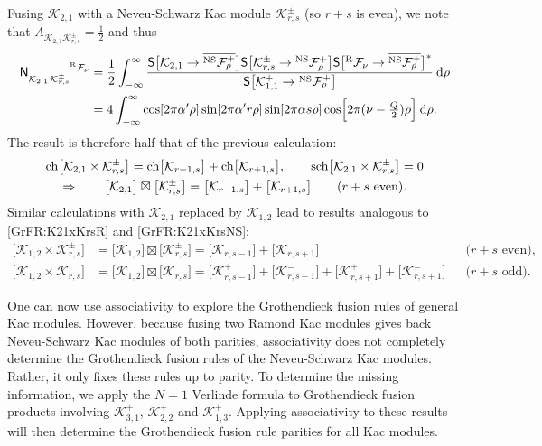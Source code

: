 \documentclass[a4paper,reqno,12pt]{report}
\theoremstyle{definition}
\numberwithin{equation}{section}
\let\originalleft\left     %
\let\originalright\right
\renewcommand{\left}{\mathopen{}\mathclose\bgroup\originalleft}
\renewcommand{\right}{\aftergroup\egroup\originalright}
\newcommand{\sqbrac}[1]{\left[ #1 \right]}
\newcommand{\dd}{\mathrm{d}}   %
\newcommand{\ra}{\rightarrow}
\newcommand{\Ra}{\Rightarrow}
\newcommand{\Kac}[1]{\mathcal{K}_{#1}}       %
\newcommand{\Fock}[1]{\mathcal{F}_{#1}}      %
\newcommand{\chmap}{\mathrm{ch}}
\newcommand{\schmap}{\mathrm{sch}}
\newcommand{\Gr}[1]{\bigl[ #1 \bigr]}            %
\newcommand{\ch}[1]{\chmap \Gr{#1}}              %
\newcommand{\sch}[1]{\schmap \Gr{#1}}              %
\newcommand{\modS}{\mathsf{S}} %
\newcommand{\Smat}[2]{\modS \bigl[ #1 \ra #2 \bigr]}  %
\newcommand{\fuse}{\mathbin{\times}}                                            %
\newcommand{\Grfuse}{\mathbin{\boxtimes}}                                       %
\newcommand{\fuscoeff}[3]{\mathsf{N}_{#1 \, #2}^{\hphantom{#1 \, #2} #3}}       %
\newcommand{\ns}{Neveu-Schwarz}
\theoremstyle{plain}
\newcommand{\NSFock}[1]{{}^{\text{NS}}\Fock{#1}}   %
\newcommand{\RFock}[1]{{}^{\text{R}}\Fock{#1}}     %
\begin{document}
Fusing $\Kac{2,1}$ with a \ns{} Kac module $\Kac{r,s}^{\pm}$ (so $r+s$ is even), we note that $A_{\Kac{2,1} \Kac{r,s}^{\pm}} = \frac{1}{2}$ and thus
\begin{align}
\fuscoeff{\Kac{2,1}}{\Kac{r,s}^{\pm}}{\RFock{\nu}} &= \frac{1}{2} \int_{-\infty}^{\infty} \frac{\Smat{\Kac{2,1}}{\overline{\NSFock{\rho}^+}} \Smat{\Kac{r,s}^{\pm}}{\NSFock{\rho}^+} \Smat{\RFock{\nu}}{\overline{\NSFock{\rho}^+}}^*}{\Smat{\Kac{1,1}^+}{\NSFock{\rho}^+}} \: \dd \rho \notag \\
&= 4 \int_{-\infty}^{\infty} \cos \sqbrac{2 \pi \alpha' \rho} \sin \sqbrac{2 \pi \alpha' r \rho} \sin \sqbrac{2 \pi \alpha s \rho} \cos \sqbrac{2 \pi (\nu - \tfrac{Q}{2}) \rho} \: \dd \rho.
\end{align}
The result is therefore half that of the previous calculation:
\begin{gather} \label{GrFR:K21xKrsNS}
\ch{\Kac{2,1} \fuse \Kac{r,s}^{\pm}} = \ch{\Kac{r-1,s}} + \ch{\Kac{r+1,s}}, \qquad \sch{\Kac{2,1} \fuse \Kac{r,s}^{\pm}} = 0 \notag \\
\Ra \qquad \Gr{\Kac{2,1}} \Grfuse \Gr{\Kac{r,s}^{\pm}} = \Gr{\Kac{r-1,s}} + \Gr{\Kac{r+1,s}} \qquad \text{(\(r+s\) even).}
\end{gather}
Similar calculations with $\Kac{2,1}$ replaced by $\Kac{1,2}$ lead to results analogous to \eqref{GrFR:K21xKrsR} and \eqref{GrFR:K21xKrsNS}:
\begin{equation}
\begin{aligned}
\Gr{\Kac{1,2} \fuse \Kac{r,s}^{\pm}} &= \Gr{\Kac{1,2}} \Grfuse \Gr{\Kac{r,s}^{\pm}} = \Gr{\Kac{r,s-1}} + \Gr{\Kac{r,s+1}} & &\text{(\(r+s\) even),} \\
\Gr{\Kac{1,2} \fuse \Kac{r,s}} &= \Gr{\Kac{1,2}} \Grfuse \Gr{\Kac{r,s}} = \Gr{\Kac{r,s-1}^+} + \Gr{\Kac{r,s-1}^-} + \Gr{\Kac{r,s+1}^+} + \Gr{\Kac{r,s+1}^-} & &\text{(\(r+s\) odd).}
\end{aligned}
\end{equation}

One can now use associativity to explore the Grothendieck fusion rules of general Kac modules.  However, because fusing two Ramond Kac modules gives back \ns{} Kac modules of both parities, associativity does not completely determine the Grothendieck fusion rules of the \ns{} Kac modules.  Rather, it only fixes these rules up to parity.  To determine the missing information, we apply the $N=1$ Verlinde formula to Grothendieck fusion products involving $\Kac{3,1}^+$, $\Kac{2,2}^+$ and $\Kac{1,3}^+$.  Applying associativity to these results will then determine the Grothendieck fusion rule parities for all Kac modules.
\end{document}
